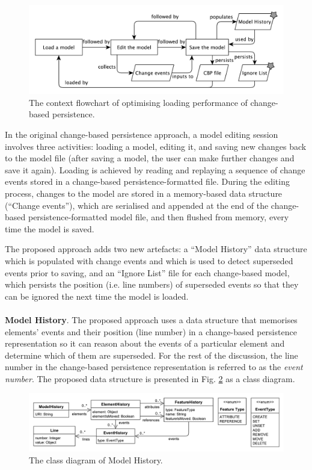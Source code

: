 \documentclass[12pt, a4paper]{report} \usepackage[titletoc]{appendix}
\begin{document}
\begin{figure}[ht]
    \centering
    \includegraphics[width=\linewidth]{flowchart}
    \caption{The context flowchart of optimising loading performance of change-based persistence.}
    \label{fig:flowchart}
\end{figure}

In the original change-based persistence approach, a model editing session involves three activities: loading a model, editing it, and saving new changes back to the model file (after saving a model, the user can make further changes and save it again). Loading is achieved by reading and replaying a sequence of change events stored in a change-based persistence-formatted file. During the editing process, changes to the model are stored in a memory-based data structure (``Change events''), which are serialised and appended at the end of the change-based persistence-formatted model file, and then flushed from memory, every time the model is saved.

The proposed approach adds two new artefacts: a ``Model History'' data structure which is populated with change events and which is used to detect superseded events prior to saving, and an ``Ignore List'' file for each change-based model, which persists the position (i.e. line numbers) of superseded events so that they can be ignored the next time the model is loaded.
\\\\
\textbf{Model History}\label{subsec:model_history}. The proposed approach uses a data structure that memorises elements' events and their position (line number) in a change-based persistence representation so it can reason about the events of a particular element and determine which of them are superseded. For the rest of the discussion, the line number in the change-based persistence representation is referred to as the \emph{event number}. The proposed data structure is presented in Fig. \ref{fig:object_history} as a class diagram.  

\begin{figure}[ht]
	\centering
	\includegraphics[width=\linewidth]{object_history}
	\caption{The class diagram of Model History.}
	\label{fig:object_history}
\end{figure}
\end{document}
